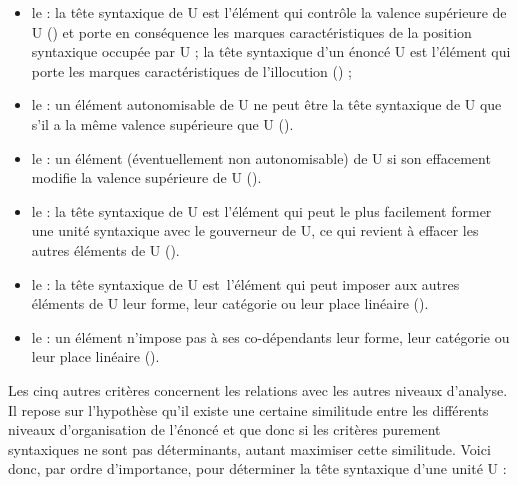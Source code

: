 \begin{itemize}
\item le  : la tête syntaxique de U est l’élément qui contrôle la valence supérieure de U () et porte en conséquence les marques caractéristiques de la position syntaxique occupée par U ; la tête syntaxique d’un énoncé U est l’élément qui porte les marques caractéristiques de l’illocution () ;
\item le : un élément autonomisable de U ne peut être la tête syntaxique de U que s’il a la même valence supérieure que U ().
\item le : un élément (éventuellement non autonomisable) de U si son effacement modifie la valence supérieure de U ().
\item le   : la tête syntaxique de U est l’élément qui peut le plus facilement former une unité syntaxique avec le gouverneur de U, ce qui revient à effacer les autres éléments de U ().
\item le  : la tête syntaxique de U est~l’élément qui peut imposer aux autres éléments de U leur forme, leur catégorie ou leur place linéaire ().
\item le  : un élément n'impose pas à ses co-dépendants leur forme, leur catégorie ou leur place linéaire ().
\end{itemize}

Les cinq autres critères concernent les relations avec les autres niveaux d’analyse. Il repose sur l’hypothèse qu’il existe une certaine similitude entre les différents niveaux d’organisation de l’énoncé et que donc si les critères purement syntaxiques ne sont pas déterminants, autant maximiser cette similitude. Voici donc, par ordre d’importance,  pour déterminer la tête syntaxique d’une unité U :

